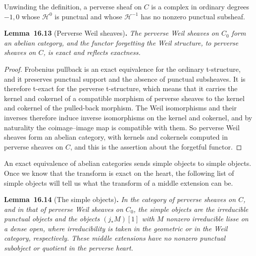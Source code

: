 \documentclass[11pt]{article}
\newenvironment{bpstatement}[2]{\par\addvspace{0.6\baselineskip}\noindent\textbf{#1}#2\textbf{.}\enspace\ignorespaces}
  {\par\addvspace{0.4\baselineskip}}
\newenvironment{bpstatementit}[2]{\begin{bpstatement}{#1}{#2}\itshape\ignorespaces}{\end{bpstatement}}
\begin{document}
\label{bp39}%
Unwinding the definition, a perverse sheaf on \(C\) is a complex in ordinary degrees \(-1,0\) whose \(\mathcal H^0\) is punctual and whose \(\mathcal H^{-1}\) has no nonzero punctual subsheaf.

\label{bp40}%
\begin{bpstatementit}{Lemma~16.13}{ (Perverse Weil sheaves)}
The perverse Weil sheaves on \(C_0\) form an abelian category, and the functor forgetting the Weil structure, to perverse sheaves on \(C\), is exact and reflects exactness.
\end{bpstatementit}

\begin{proof}[{Proof}]\label{bp41}%
Frobenius pullback is an exact equivalence for the ordinary t-structure, and it preserves punctual support and the absence of punctual subsheaves. It is therefore t-exact for the perverse t-structure, which means that it carries the kernel and cokernel of a compatible morphism of perverse sheaves to the kernel and cokernel of the pulled-back morphism. The Weil isomorphisms and their inverses therefore induce inverse isomorphisms on the kernel and cokernel, and by naturality the coimage–image map is compatible with them. So perverse Weil sheaves form an abelian category, with kernels and cokernels computed in perverse sheaves on \(C\), and this is the assertion about the forgetful functor.
\end{proof}

\label{bp42}%
An exact equivalence of abelian categories sends simple objects to simple objects. Once we know that the transform is exact on the heart, the following list of simple objects will tell us what the transform of a middle extension can be.

\label{bp43}%
\begin{bpstatementit}{Lemma~16.14}{ (The simple objects)}
In the category of perverse sheaves on \(C\), and in that of perverse Weil sheaves on \(C_0\), the simple objects are the irreducible punctual objects and the objects \((j_*M)[1]\) with \(M\) nonzero irreducible lisse on a dense open, where irreducibility is taken in the geometric or in the Weil category, respectively. These middle extensions have no nonzero punctual subobject or quotient in the perverse heart.
\end{bpstatementit}
\end{document}
